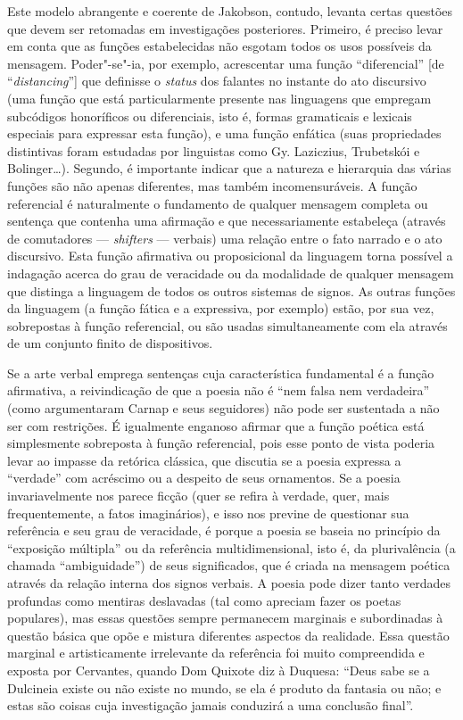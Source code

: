 Este modelo abrangente e coerente de Jakobson, contudo, levanta certas
questões que devem ser retomadas em investigações posteriores. Primeiro,
é preciso levar em conta que as funções estabelecidas não esgotam todos
os usos possíveis da mensagem. Poder"-se"-ia, por exemplo, acrescentar uma
função ``diferencial'' [de ``\emph{distancing}''] que definisse o
\emph{status} dos falantes no instante do ato discursivo (uma função que está
particularmente presente nas linguagens que empregam subcódigos
honoríficos ou diferenciais, isto é, formas gramaticais e lexicais
especiais para expressar esta função), e uma função enfática (suas
propriedades distintivas foram estudadas por linguistas como Gy.
Laziczius, Trubetskói e Bolinger\ldots{}). Segundo, é importante
indicar que a natureza e hierarquia das várias funções são não apenas
diferentes, mas também incomensuráveis. A função referencial é
naturalmente o fundamento de qualquer mensagem completa ou sentença que
contenha uma afirmação e que necessariamente estabeleça (através de
comutadores --- \emph{shifters} --- verbais) uma relação entre o fato
narrado e o ato discursivo. Esta função afirmativa ou proposicional da
linguagem torna possível a indagação acerca do grau de veracidade ou da
modalidade de qualquer mensagem que distinga a linguagem de todos os
outros sistemas de signos. As outras funções da linguagem (a função
fática e a expressiva, por exemplo) estão, por sua vez, sobrepostas à
função referencial, ou são usadas simultaneamente com ela através de um
conjunto finito de dispositivos.

Se a arte verbal emprega sentenças cuja característica fundamental é a
função afirmativa, a reivindicação de que a poesia não é ``nem falsa nem
verdadeira'' (como argumentaram Carnap e seus seguidores) não pode ser
sustentada a não ser com restrições. É igualmente enganoso afirmar que a
função poética está simplesmente sobreposta à função referencial, pois
esse ponto de vista poderia levar ao impasse da retórica clássica, que
discutia se a poesia expressa a ``verdade'' com acréscimo ou a
despeito de seus ornamentos. Se a poesia invariavelmente nos parece
ficção (quer se refira à verdade, quer, mais frequentemente, a fatos
imaginários), e isso nos previne de questionar sua referência e seu grau
de veracidade, é porque a poesia se baseia no princípio da ``exposição
múltipla'' ou da referência multidimensional, isto é, da plurivalência
(a chamada ``ambiguidade'') de seus significados, que é criada na
mensagem poética através da relação interna dos signos verbais. A poesia
pode dizer tanto verdades profundas como mentiras deslavadas (tal como
apreciam fazer os poetas populares), mas essas questões sempre
permanecem marginais e subordinadas à questão básica que opõe e mistura
diferentes aspectos da realidade. Essa questão marginal e artisticamente
irrelevante da referência foi muito compreendida e exposta por
Cervantes, quando Dom Quixote diz à Duquesa: ``Deus sabe se a Dulcineia
existe ou não existe no mundo, se ela é produto da fantasia ou não; e
estas são coisas cuja investigação jamais conduzirá a uma conclusão
final''.

